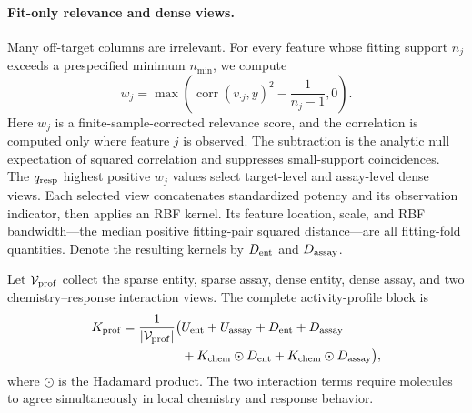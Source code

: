 \documentclass[manuscript,nonacm]{acmart}
\begin{document}
\paragraph{Fit-only relevance and dense views.}
Many off-target columns are irrelevant. For every feature whose fitting support
$n_j$ exceeds a prespecified minimum $n_{\min}$, we compute
\begin{equation}
w_j=\max\left(\operatorname{corr}(v_{\cdot j},y)^2-
\frac{1}{n_j-1},0\right).
\end{equation}
Here $w_j$ is a finite-sample-corrected relevance score, and the correlation is
computed only where feature $j$ is observed. The subtraction is the analytic
null expectation of squared correlation and suppresses small-support
coincidences. The $q_{\rm resp}$ highest positive $w_j$ values select
target-level and assay-level dense views. Each selected view concatenates
standardized potency and its observation indicator, then applies an RBF kernel.
Its feature location, scale, and RBF bandwidth---the median positive fitting-pair
squared distance---are all fitting-fold quantities.  Denote the resulting
kernels by $D_{\rm ent}$ and $D_{\rm assay}$.

Let $\mathcal{V}_{\rm prof}$ collect the sparse entity, sparse assay, dense
entity, dense assay, and two chemistry--response interaction views. The
complete activity-profile block is
\begin{align}
K_{\mathrm{prof}}=\frac{1}{|\mathcal{V}_{\rm prof}|}\big(&U_{\rm ent}+U_{\rm assay}
+D_{\rm ent}+D_{\rm assay}\nonumber\\
&+K_{\rm chem}\odot D_{\rm ent}
+K_{\rm chem}\odot D_{\rm assay}\big),
\end{align}
where $\odot$ is the Hadamard product.  The two interaction terms require
molecules to agree simultaneously in local chemistry and response behavior.
\end{document}
